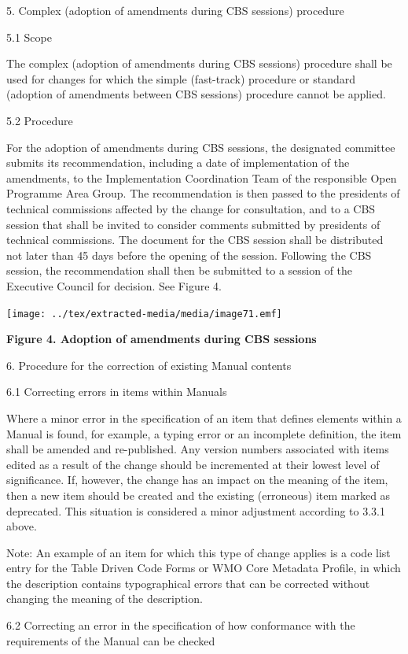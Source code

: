 5. Complex (adoption of amendments during CBS sessions) procedure

5.1 Scope

The complex (adoption of amendments during CBS sessions) procedure shall be used for changes for which the simple (fast-track) procedure or standard (adoption of amendments between CBS sessions) procedure cannot be applied.

5.2 Procedure

For the adoption of amendments during CBS sessions, the designated committee submits its recommendation, including a date of implementation of the amendments, to the Implementation Coordination Team of the responsible Open Programme Area Group. The recommendation is then passed to the presidents of technical commissions affected by the change for consultation, and to a CBS session that shall be invited to consider comments submitted by presidents of technical commissions. The document for the CBS session shall be distributed not later than 45 days before the opening of the session. Following the CBS session, the recommendation shall then be submitted to a session of the Executive Council for decision. See Figure 4.

\texttt{[image: ../tex/extracted-media/media/image71.emf]}

\textbf{Figure 4. Adoption of amendments during CBS sessions}

6. Procedure for the correction of existing Manual contents

6.1 Correcting errors in items within Manuals

Where a minor error in the specification of an item that defines elements within a Manual is found, for example, a typing error or an incomplete definition, the item shall be amended and re-published. Any version numbers associated with items edited as a result of the change should be incremented at their lowest level of significance. If, however, the change has an impact on the meaning of the item, then a new item should be created and the existing (erroneous) item marked as deprecated. This situation is considered a minor adjustment according to 3.3.1 above.

Note: An example of an item for which this type of change applies is a code list entry for the Table Driven Code Forms or WMO Core Metadata Profile, in which the description contains typographical errors that can be corrected without changing the meaning of the description.

6.2 Correcting an error in the specification of how conformance with the requirements of the Manual can be checked

